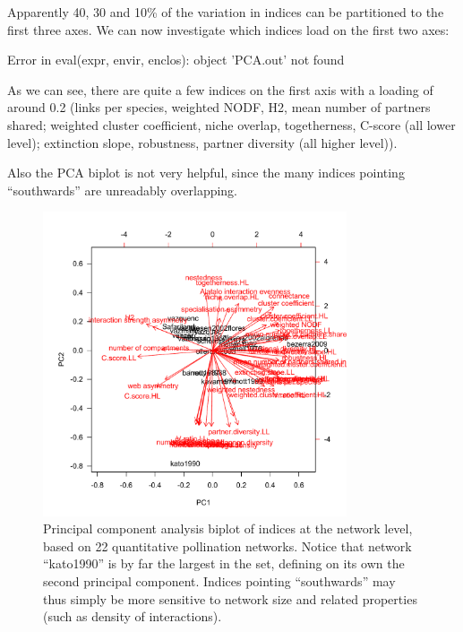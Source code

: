 \documentclass[a4paper, 11pt]{article}\usepackage[]{graphicx}\usepackage[]{color}
\begin{document}
Apparently 40, 30 and 10\% of the variation in indices can be partitioned to the first three axes. We can now investigate which indices load on the first two axes:
\begin{Schunk}
\begin{Soutput}
Error in eval(expr, envir, enclos): object 'PCA.out' not found
\end{Soutput}
\end{Schunk}
As we can see, there are quite a few indices on the first axis with a loading of around 0.2 (links per species, weighted NODF, H2, mean number of partners shared; weighted cluster coefficient, niche overlap, togetherness, C-score (all lower level); extinction slope, robustness, partner diversity (all higher level)). 

Also the PCA biplot is not very helpful, since the many indices pointing ``southwards'' are unreadably overlapping.
%
\begin{figure}
\centering
\includegraphics[width=0.8\textwidth]{figures/PCAnetworklevel}
\caption{Principal component analysis biplot of indices at the network level, based on 22 quantitative pollination networks. Notice that network ``kato1990'' is by far the largest in the set, defining on its own the second principal component. Indices pointing ``southwards'' may thus simply be more sensitive to network size and related properties (such as density of interactions).}
\label{fig:PCAnetworklevel}
\end{figure}
\end{document}
